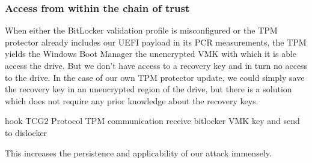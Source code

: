 \subsubsection{Access from within the chain of trust}

When either the BitLocker validation profile is misconfigured or the \ac{TPM} protector already includes our \ac{UEFI} payload in its \ac{PCR} measurements, the \ac{TPM} yields the Windows Boot Manager the unencrypted \ac{VMK} with which it is able access the drive.
But we don't have access to a recovery key and in turn no access to the drive.
In the case of our own \ac{TPM} protector update, we could simply save the recovery key in an unencrypted region of the drive, but there is a solution which does not require any prior knowledge about the recovery keys.

hook \ac{TCG}2 Protocol \cite[6.7.3]{tcg-efi-protocol-spec}
\ac{TPM} communication
receive bitlocker \ac{VMK} key and send to dislocker
\cite{bde-format-spec}
\cite{tpm-sniffing}

This increases the persistence and applicability of our attack immensely.